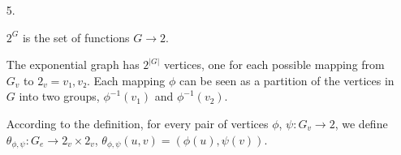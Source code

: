 \documentclass[notitlepage]{article}
\begin{document}
\begin{enumerate}
\begin{enumerate}
\begin{proof}
\begin{description}
        Then:

        $$f = \epsilon \circ \langle z, id_{B \times C} \rangle = \epsilon \circ \langle z^\prime, id_{B \times C} \rangle = f$$
        
        $$f \circ \iota = \epsilon \circ \langle z, id_{B \times C} \rangle \iota = \epsilon \circ \langle z^\prime, id_{B \times C} \rangle \iota = f \circ \iota$$
        
        $$g_1 = \epsilon_{BC} \iota \circ \langle z, \langle id_B, id_C \rangle \rangle \iota = \epsilon_{BC} \iota \circ \langle z^\prime, \langle id_B, id_C \rangle \rangle \iota = g_1$$
        
        $$\epsilon_{BC} \circ \langle \langle z, id_C \rangle id_B \rangle = \epsilon_{BC} \circ \langle \langle z^\prime, id_C \rangle , id_B \rangle$$
        
        $$\epsilon_{B} \circ \langle \epsilon_{C}, id_{B} \rangle \circ \langle \langle z, id_C \rangle id_B \rangle = \epsilon_{B} \circ \langle \epsilon_{C}, id_B \rangle \circ \langle \langle z^\prime, id_C \rangle , id_B \rangle$$
        
        $$\epsilon_{B} \circ \langle \epsilon_C \circ \langle z, id_C \rangle id_B \rangle = \epsilon_{B} \circ \langle \epsilon_C \circ \langle z^\prime, id_C \rangle , id_B \rangle$$

        Universality of ($A^B$):

        $$\epsilon_C \circ \langle z, id_C \rangle = \epsilon_C \circ \langle z^\prime, id_C \rangle$$
        
        Universality of ($(A^B)^C$)
        
        $$z = z^\prime$$

     \end{description}

     \end{proof}

   \end{enumerate}

   \item[ 5.]

     $2^G$ is the set of functions $G → 2$.

     The exponential graph has $2^{\vert G \vert }$ vertices, one for each
     possible mapping from $G_v$ to $2_v = {v₁,v₂}$. Each mapping $\phi$ can be
     seen as a partition of the vertices in $G$ into two groups, $\phi^{-1}(v_1)$
     and $\phi^{-1}(v_2)$.

     According to the definition, for every pair of vertices $\phi$,
     $\psi : G_v → 2$, we define
     $\theta_{\phi,\psi} : G_e → 2_v \times 2_v$,
     $\theta_{\phi,\psi}(u,v) = (\phi(u), \psi(v))$.


\end{enumerate}
\end{document}
